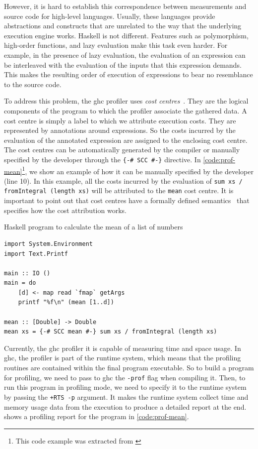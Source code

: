 However, it is hard to establish this correspondence between measurements and source code for high-level languages. Usually, these languages provide abstractions and constructs that are unrelated to the way that the underlying execution engine works. Haskell is not different. Features such as polymorphism, high-order functions, and lazy evaluation make this task even harder. For example, in the presence of lazy evaluation, the evaluation of an expression can be interleaved with the evaluation of the inputs that this expression demands. This makes the resulting order of execution of expressions to bear no resemblance to the source code.

To address this problem, the \ac{ghc} profiler uses \emph{cost centres}~\cite{sansom:1995}. They are the logical components of the program to which the profiler associate the gathered data. A cost centre is simply a label to which we attribute execution costs. They are represented by annotations around expressions. So the costs incurred by the evaluation of the annotated expression are assigned to the enclosing cost centre. The cost centres can be automatically generated by the compiler or manually specified by the developer through the \texttt{\{-\# SCC \#-\}} directive. In \autoref{code:prof-mean}\footnote{This code example was extracted from \cite{sullivan:2008}}, we show an example of how it can be manually specified by the developer (line 10). In this example, all the costs incurred by the evaluation of \texttt{sum xs / fromIntegral (length xs)} will be attributed to the \texttt{mean} cost centre. It is important to point out that cost centres have a formally defined semantics~\cite{sansom:1995} that specifies how the cost attribution works.

\begin{listing}
  \caption{Haskell program to calculate the mean of a list of numbers}
  \begin{verbatim}
import System.Environment
import Text.Printf

main :: IO ()
main = do
    [d] <- map read `fmap` getArgs
    printf "%f\n" (mean [1..d])

mean :: [Double] -> Double
mean xs = {-# SCC mean #-} sum xs / fromIntegral (length xs)
  \end{verbatim}
  \label{code:prof-mean}
\end{listing}

Currently, the \ac{ghc} profiler it is capable of measuring time and space usage. In \ac{ghc}, the profiler is part of the runtime system, which means that the profiling routines are contained within the final program executable. So to build a program for profiling, we need to pass to \ac{ghc} the \texttt{-prof} flag when compiling it. Then, to run this program in profiling mode, we need to specify it to the runtime system by passing the \texttt{+RTS -p} argument. It makes the runtime system collect time and memory usage data from the execution to produce a detailed report at the end.  shows a profiling report for the program in \autoref{code:prof-mean}.

